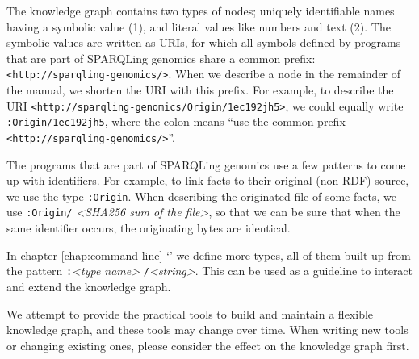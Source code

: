   \begin{sloppypar}
  The knowledge graph contains two types of nodes; uniquely identifiable
  names having a symbolic value (1), and literal values like numbers and
  text (2).  The symbolic values are written as URIs, for which all symbols
  defined by programs that are part of SPARQLing genomics share a common
  prefix: \texttt{<http://sparqling-genomics/>}.  When we describe a node
  in the remainder of the manual, we shorten the URI with this prefix.
  For example, to describe the URI
  \texttt{<http://sparqling-genomics/Origin/1ec192jh5>}, we could equally
  write \texttt{:Origin/1ec192jh5}, where the colon means ``use the
  common prefix \texttt{<http://sparqling-genomics/>}''.
  \end{sloppypar}

  The programs that are part of SPARQLing genomics use a few patterns to
  come up with identifiers.  For example, to link facts to their original
  (non-RDF) source, we use the type \texttt{:Origin}.  When describing the
  originated file of some facts, we use \texttt{:Origin/}%
  \emph{<SHA256 sum of the file>}, so that we can be sure that when the
  same identifier occurs, the originating bytes are identical.

  In chapter \ref{chap:command-line}
  {\color{LinkGray}`'} we define more types,
  all of them built up from the pattern \texttt{:}\emph{<type name>}%
  \texttt{/}\emph{<string>}.  This can be used as a guideline to interact
  and extend the knowledge graph.

  We attempt to provide the practical tools to build and maintain a flexible
  knowledge graph, and these tools may change over time.  When writing new
  tools or changing existing ones, please consider the effect on the knowledge
  graph first.
